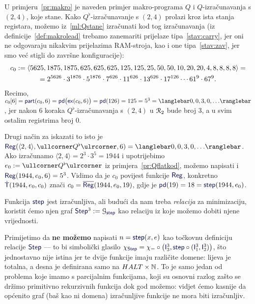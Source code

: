 \begin{primjer}
U primjeru~\ref{pr:makro} je naveden primjer makro-programa $Q$ i $Q$-izračunavanja s $(2,4)$, koje stane. Kako $Q^\flat$-izračunavanje s $(2,4)$ prolazi kroz ista stanja registara, možemo iz~\eqref{ml:Qstane} izračunati kod tog izračunavanja (iz definicije~\ref{def:makrolead} trebamo zanemariti prijelaze tipa~\ref{stav:carry}, jer oni ne odgovaraju nikakvim prijelazima RAM-stroja, kao i one tipa~\ref{stav:zav}, jer smo već stigli do završne konfiguracije):
\begin{multline}
    c_0:=\langle5625,1875,1875,625,625,625,125,125,25,50,50,10,20,20,4,8,8,8,8\rangle=\\
    =2^{5626}\cdot3^{1876}\cdot5^{1876}\cdot7^{626}\cdot11^{626}\cdot13^{626}\cdot17^{126}\dotsm61^9\cdot67^9\text.
\end{multline}
Recimo, $c_0[6]=\f{part}(c_0,6)=\f{pd}\bigl(\f{ex}(c_0,6)\bigr)=\f{pd}(126)=125=5^3=\knk{0,0,3,0,\dotsc}$, jer nakon $6$ koraka $Q^\flat$-izračunavanja s $(2,4)$ u $\mathcal R_{2}$ bude broj $3$, a u svim ostalim registrima broj $0$.

Drugi način za iskazati to isto je $\f{Reg}(\langle2,4\rangle,\kprog{Q^\flat},6)=\knk{0,0,3,0,\dotsc}$. Ako iz\-ra\-ču\-na\-mo $\langle2,4\rangle=2^3\cdot3^5=1944$ i upotrijebimo $e_0:=\kprog{Q^\flat}$ iz primjera~\ref{pr:Qflatkod}, možemo napisati i $\f{Reg}(1944,e_0,6)=5^3$. Vidimo da je $c_0$ povijest funkcije $\f{Reg}$, konkretno $\f{\dot T}(1944,e_0,c_0)$ znači $c_0=\overline{\f{Reg}}(1944,e_0,19)$, gdje je $\f{pd}(19)=18=\f{step}(1944,e_0)$.
\end{primjer}


Funkcija $\f{step}$ jest izračunljiva, ali budući da nam treba \emph{relacija} za minimizaciju, koristit ćemo njen graf $\f{Step}^3:=\graf{\f{step}}$ kao relaciju iz koje možemo dobiti njene vrijednosti. 

\begin{napomena}\label{nap:parc=}
Primijetimo da \textbf{ne možemo} napisati $n=\f{step}(x,e)$ kao točkovnu definiciju relacije $\f{Step}$ --- to bi simbolički glasilo $\chi_{\f{Step}}=\chi_=\circ\bigl(\f I_3^3,\f{step}\circ(\f I_1^3,\f I_2^3)\bigr)$, što jednostavno nije istina jer te dvije funkcije imaju različite domene: lijeva je totalna, a desna je definirana samo na $HALT\times{\mathbb N}$. To je samo jedan od problema koje imamo s parcijalnim funkcijama, koji su osnovni razlog zašto se držimo primitivno rekurzivnih funkcija dok god možemo: vidjet ćemo kasnije da općenito graf (baš kao ni domena) izračunljive funkcije ne mora biti izračunljiv.
\end{napomena}


